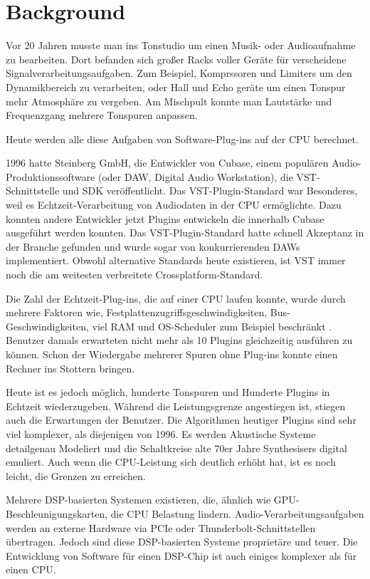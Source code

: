 \section{Background}

Vor 20 Jahren musste man ins Tonstudio um einen Musik- oder Audioaufnahme zu bearbeiten. Dort befanden sich großer Racks voller Geräte für verscheidene Signalverarbeitungsaufgaben. Zum Beispiel, Komprssoren und Limiters um den Dynamikbereich zu verarbeiten, oder Hall und Echo geräte um einen Tonspur mehr Atmosphäre zu vergeben. Am Mischpult konnte man Lautstärke und Frequenzgang mehrere Tonspuren anpassen.

Heute werden alle diese Aufgaben von Software-Plug-ins auf der CPU berechnet.

1996 hatte Steinberg GmbH, die Entwickler von Cubase, einem populären Audio-Produktionssoftware (oder DAW, Digital Audio Workstation), die VST-Schnittstelle und SDK veröffentlicht. Das VST-Plugin-Standard war Besonderes, weil es Echtzeit-Verarbeitung von Audiodaten in der CPU ermöglichte. Dazu konnten andere Entwickler jetzt Plugins entwickeln die innerhalb Cubase ausgeführt werden konnten. Das VST-Plugin-Standard hatte schnell Akzeptanz in der Branche gefunden und wurde sogar von konkurrierenden DAWs implementiert. Obwohl alternative Standards heute existieren, ist VST immer noch die am weitesten verbreitete Crossplatform-Standard.

Die Zahl der Echtzeit-Plug-ins, die auf einer CPU laufen konnte, wurde durch mehrere Faktoren wie, Festplattenzugriffsgeschwindigkeiten, Bus-Geschwindigkeiten, viel RAM und OS-Scheduler zum Beispiel beschränkt \cite{brandt1998low}. Benutzer damals erwarteten nicht mehr als 10 Plugins gleichzeitig ausführen zu können. Schon der Wiedergabe mehrerer Spuren ohne Plug-ins konnte einen Rechner ins Stottern bringen.

Heute ist es jedoch möglich, hunderte Tonspuren und Hunderte Plugins in Echtzeit wiederzugeben. Während die Leistungsgrenze angestiegen ist, stiegen auch die Erwartungen der Benutzer. Die Algorithmen heutiger Plugins sind sehr viel komplexer, als diejenigen von 1996. Es werden Akustische Systeme detailgenau Modeliert und die Schaltkreise alte 70er Jahre Synthesisers digital emuliert. Auch wenn die CPU-Leistung sich deutlich erhöht hat, ist es noch leicht, die Grenzen zu erreichen.

Mehrere DSP-basierten Systemen existieren, die, ähnlich wie GPU-Beschleunigungskarten,  die CPU Belastung lindern. Audio-Verarbeitungsaufgaben werden an externe Hardware via PCIe oder Thunderbolt-Schnittstellen übertragen. Jedoch sind diese DSP-basierten Systeme proprietäre und teuer. Die Entwicklung von Software für einen DSP-Chip ist auch einiges komplexer als für einen CPU.